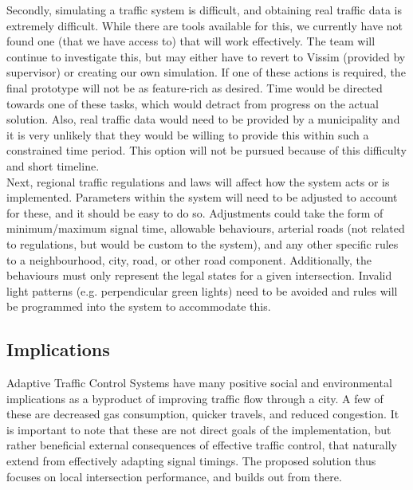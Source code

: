 \documentclass{article}
\begin{document}
Secondly, simulating a traffic system is difficult, and obtaining real traffic data is extremely difficult.
While there are tools available for this, we currently have not found one (that we have access to) that will work effectively.
The team will continue to investigate this, but may either have to revert to Vissim (provided by supervisor) or creating our own simulation.
If one of these actions is required, the final prototype will not be as feature-rich as desired.
Time would be directed towards one of these tasks, which would detract from progress on the actual solution.
Also, real traffic data would need to be provided by a municipality and it is very unlikely that they would be willing to provide this within such a constrained time period.
This option will not be pursued because of this difficulty and short timeline.\\

Next, regional traffic regulations and laws will affect how the system acts or is implemented.
Parameters within the system will need to be adjusted to account for these, and it should be easy to do so.
Adjustments could take the form of minimum/maximum signal time, allowable behaviours, arterial roads (not related to regulations, but would be custom to the system), and any other specific rules to a neighbourhood, city, road, or other road component.
Additionally, the behaviours must only represent the legal states for a given intersection.
Invalid light patterns (e.g. perpendicular green lights) need to be avoided and rules will be programmed into the system to accommodate this.\\

\subsection{Implications}

Adaptive Traffic Control Systems have many positive social and environmental implications as a byproduct of improving traffic flow through a city.
A few of these are decreased gas consumption, quicker travels, and reduced congestion.
It is important to note that these are not direct goals of the implementation, but rather beneficial external consequences of effective traffic control, that naturally extend from effectively adapting signal timings.
The proposed solution thus focuses on local intersection performance, and builds out from there.
\end{document}
